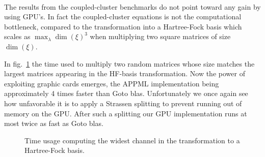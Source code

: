 \paragraph{}
The results from the coupled-cluster benchmarks do not point toward any gain by using GPU's.
In fact the coupled-cluster equations is not the computational bottleneck, compared to the transformation into a Hartree-Fock basis which scales as $ \max_{\lambda}\dim(\xi)^3$ when multiplying two square matrices of size $\dim(\xi)$.

In fig.~\ref{fig:results:timeMultHFsys} the time used to multiply two random matrices whose size matches the largest matrices appearing in the HF-basis transformation.
Now the power of exploiting graphic cards emerges, the APPML implementation being approximately 4 times faster than Goto blas.
Unfortunately we once again see how unfavorable it is to apply a Strassen splitting to prevent running out of memory on the GPU.
After such a splitting our GPU implementation runs at most twice as fast as Goto blas.
\begin{figure}
\begin{center}
\caption{Time usage computing the widest channel in the transformation to a Hartree-Fock basis.}
\label{fig:results:timeMultHFsys}
\end{center}
\end{figure}

